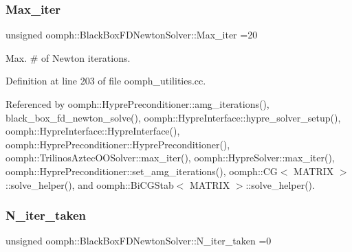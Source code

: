 \mbox{\label{namespaceoomph_1_1BlackBoxFDNewtonSolver_a20ac8568daf0d63afa3945a817ff3e2d}} 
\subsubsection{\texorpdfstring{Max\+\_\+iter}{Max\_iter}}
{\footnotesize\ttfamily unsigned oomph\+::\+Black\+Box\+F\+D\+Newton\+Solver\+::\+Max\+\_\+iter =20}



Max. \# of Newton iterations. 



Definition at line 203 of file oomph\+\_\+utilities.\+cc.



Referenced by oomph\+::\+Hypre\+Preconditioner\+::amg\+\_\+iterations(), black\+\_\+box\+\_\+fd\+\_\+newton\+\_\+solve(), oomph\+::\+Hypre\+Interface\+::hypre\+\_\+solver\+\_\+setup(), oomph\+::\+Hypre\+Interface\+::\+Hypre\+Interface(), oomph\+::\+Hypre\+Preconditioner\+::\+Hypre\+Preconditioner(), oomph\+::\+Trilinos\+Aztec\+O\+O\+Solver\+::max\+\_\+iter(), oomph\+::\+Hypre\+Solver\+::max\+\_\+iter(), oomph\+::\+Hypre\+Preconditioner\+::set\+\_\+amg\+\_\+iterations(), oomph\+::\+C\+G$<$ M\+A\+T\+R\+I\+X $>$\+::solve\+\_\+helper(), and oomph\+::\+Bi\+C\+G\+Stab$<$ M\+A\+T\+R\+I\+X $>$\+::solve\+\_\+helper().

\mbox{\label{namespaceoomph_1_1BlackBoxFDNewtonSolver_a3067ba88fad991fdb619eae7533028bd}} 
\subsubsection{\texorpdfstring{N\+\_\+iter\+\_\+taken}{N\_iter\_taken}}
{\footnotesize\ttfamily unsigned oomph\+::\+Black\+Box\+F\+D\+Newton\+Solver\+::\+N\+\_\+iter\+\_\+taken =0}



